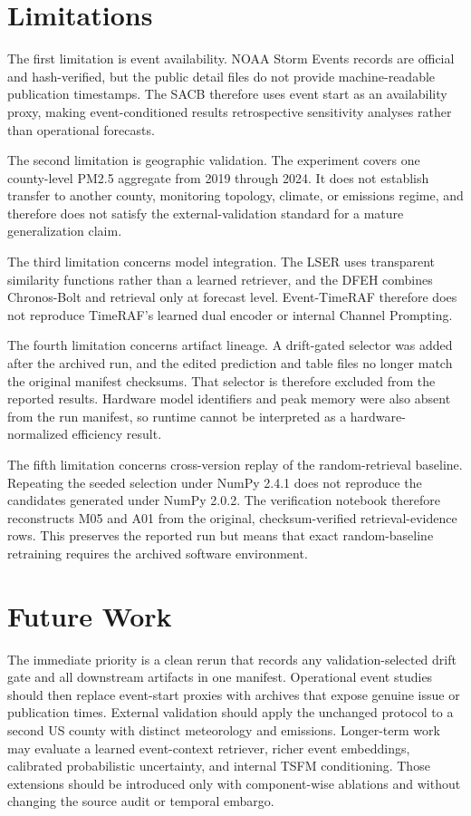 \section{Limitations}

The first limitation is event availability. NOAA Storm Events records are
official and hash-verified, but the public detail files do not provide
machine-readable publication timestamps. The SACB therefore uses event start as
an availability proxy, making event-conditioned results retrospective
sensitivity analyses rather than operational forecasts.

The second limitation is geographic validation. The experiment covers one
county-level PM2.5 aggregate from 2019 through 2024. It does not establish
transfer to another county, monitoring topology, climate, or emissions regime,
and therefore does not satisfy the external-validation standard for a mature
generalization claim.

The third limitation concerns model integration. The LSER uses transparent
similarity functions rather than a learned retriever, and the DFEH combines
Chronos-Bolt and retrieval only at forecast level. Event-TimeRAF therefore does
not reproduce TimeRAF's learned dual encoder or internal Channel Prompting.

The fourth limitation concerns artifact lineage. A drift-gated selector was
added after the archived run, and the edited prediction and table files no
longer match the original manifest checksums. That selector is therefore
excluded from the reported results. Hardware model identifiers and peak memory
were also absent from the run manifest, so runtime cannot be interpreted as a
hardware-normalized efficiency result.

The fifth limitation concerns cross-version replay of the random-retrieval
baseline. Repeating the seeded selection under NumPy 2.4.1 does not reproduce
the candidates generated under NumPy 2.0.2. The verification notebook therefore
reconstructs M05 and A01 from the original, checksum-verified retrieval-evidence
rows. This preserves the reported run but means that exact random-baseline
retraining requires the archived software environment.

\section{Future Work}

The immediate priority is a clean rerun that records any validation-selected
drift gate and all downstream artifacts in one manifest. Operational event studies
should then replace event-start proxies with archives that expose genuine issue
or publication times. External validation should apply the unchanged protocol
to a second US county with distinct meteorology and emissions. Longer-term work
may evaluate a learned event-context retriever, richer event embeddings,
calibrated probabilistic uncertainty, and internal TSFM conditioning. Those
extensions should be introduced only with component-wise ablations and without
changing the source audit or temporal embargo.
